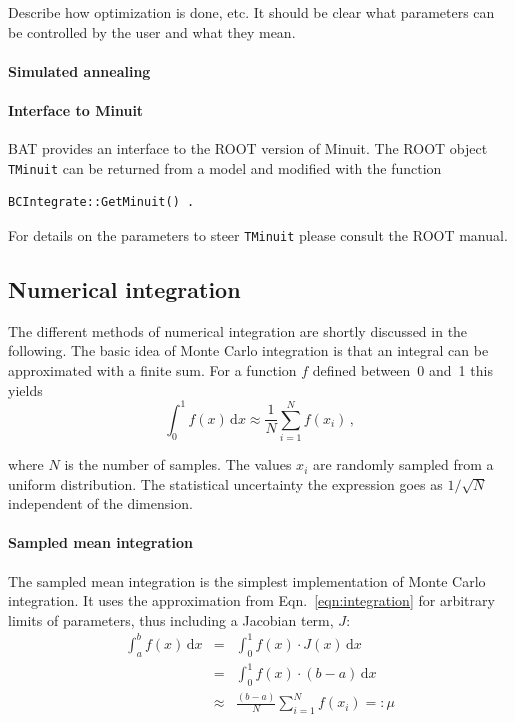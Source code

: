 \documentclass[11pt, a4paper]{article}
\begin{document}
Describe how optimization is done, etc. It should be clear what
parameters can be controlled by the user and what they mean.

\paragraph{Simulated annealing} 

\paragraph{Interface to Minuit} 

BAT provides an interface to the ROOT version of Minuit. The ROOT object 
\verb|TMinuit| can be returned from a model and modified with the function 
%
\begin{verbatim}
BCIntegrate::GetMinuit() . 
\end{verbatim} 

\noindent 
For details on the parameters to steer \verb|TMinuit| please consult the ROOT manual. 


\subsection{Numerical integration} 
\label{subsection:integration} 

The different methods of numerical integration are shortly discussed
in the following. The basic idea of Monte Carlo integration is that an
integral can be approximated with a finite sum. For a function $f$
defined between~0 and~1 this yields
% 
\begin{equation}
\int_{0}^{1} f(x) \, \mathrm{d}x \approx \frac{1}{N} \sum_{i=1}^{N} f(x_{i}) \, , 
\label{eqn:integration}
\end{equation} 

\noindent 
where $N$ is the number of samples. The values $x_{i}$ are randomly
sampled from a uniform distribution. The statistical uncertainty the
expression goes as $1/\sqrt{N}$ independent of the dimension. 

\paragraph{Sampled mean integration} 

The sampled mean integration is the simplest implementation of Monte
Carlo integration. It uses the approximation from
Eqn.~\ref{eqn:integration} for arbitrary limits of parameters, thus
including a Jacobian term, $J$:
%
\begin{eqnarray}
\int_{a}^{b} f(x) \, \mathrm{d}x & = & \int_{0}^{1} f(x) \cdot J(x) \, \mathrm{d}x \\ 
                                 & = & \int_{0}^{1} f(x) \cdot (b - a) \, \mathrm{d}x \\ 
				 & \approx & \frac{(b - a)}{N} \sum_{i=1}^{N} f(x_{i}) =: \mu
\end{eqnarray} 
\end{document}
